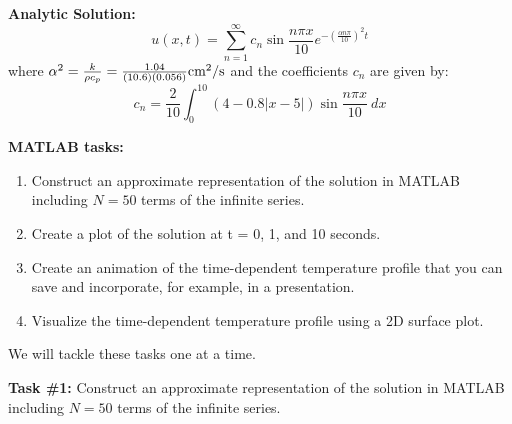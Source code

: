 \noindent\textbf{Analytic Solution: } 
\begin{equation}
u(x,t) = \sum\limits_{n=1}^{\infty} c_n \sin{\frac{n \pi x}{10}}e^{-\left(\frac{\alpha n \pi}{10}\right)^2t}
\label{eq:lec25-ex1-sol}
\end{equation}
where $\alpha^2 = \frac{k}{\rho c_p} = \frac{1.04}{(10.6)(0.056)} \text{cm\textsuperscript{2}}/\text{s}$ and the coefficients $c_n$ are given by:
\begin{equation*}
c_n = \frac{2}{10}\int_{0}^{10} \left(4-0.8\left|x-5\right| \right)\sin{\frac{n \pi x}{10}} \ dx
\end{equation*}

\vspace{0.5cm}

\noindent\textbf{MATLAB tasks:}
\begin{enumerate}
\item Construct an approximate representation of the solution in MATLAB including $N=50$ terms of the infinite series.
\item Create a plot of the solution at t = 0, 1, and 10 seconds.
\item Create an animation of the time-dependent temperature profile that you can save and incorporate, for example, in a presentation.
\item Visualize the time-dependent temperature profile using a 2D surface plot.
\end{enumerate}

We will tackle these tasks one at a time.

\vspace{0.25cm}

\noindent\textbf{Task \#1: } Construct an approximate representation of the solution in MATLAB including $N=50$ terms of the infinite series.  

\vspace{0.25cm} 

